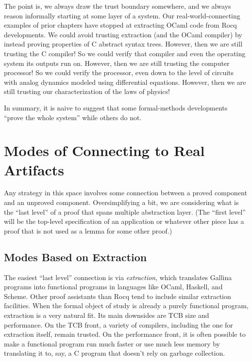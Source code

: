\documentclass{amsbook}
\theoremstyle{definition}
\theoremstyle{remark}
\numberwithin{section}{chapter}
\numberwithin{equation}{chapter}
\begin{document}
The point is, we always draw the trust boundary somewhere, and we always reason informally starting at some layer of a system.
Our real-world-connecting examples of prior chapters have stopped at extracting OCaml code from Rocq developments.
We could avoid trusting extraction (and the OCaml compiler) by instead proving properties of C abstract syntax trees.
However, then we are still trusting the C compiler!
So we could verify that compiler and even the operating system its outputs run on.
However, then we are still trusting the computer processor!
So we could verify the processor, even down to the level of circuits with analog dynamics modeled using differential equations.
However, then we are still trusting our characterization of the laws of physics!

In summary, it is naive to suggest that some formal-methods developments ``prove the whole system'' while others do not.

\section{Modes of Connecting to Real Artifacts}

\encoding
Any strategy in this space involves some connection between a proved component and an unproved component.
Oversimplifying a bit, we are considering what is the ``last level'' of a proof that spans multiple abstraction layer.
(The ``first level'' will be the top-level specification of an application or whatever other piece has a proof that is not used as a lemma for some other proof.)

\subsection{Modes Based on Extraction}

The easiest ``last level'' connection is via \emph{extraction}, which translates Gallina programs into functional programs in languages like OCaml, Haskell, and Scheme.
Other proof assistants than Rocq tend to include similar extraction facilities.
When the formal object of study is already a purely functional program, extraction is a very natural fit.
Its main downsides are TCB size and performance.
On the TCB front, a variety of compilers, including the one for extraction itself, remain trusted.
On the performance front, it is often possible to make a functional program run much faster or use much less memory by translating it to, say, a C program that doesn't rely on garbage collection.
\end{document}
